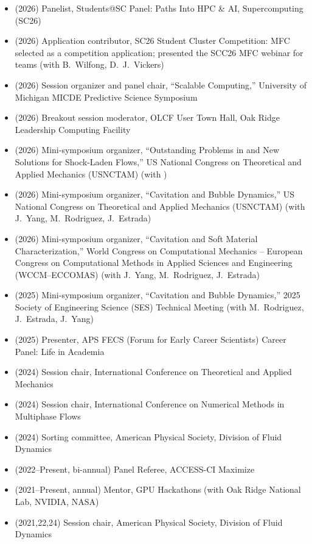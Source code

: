 \begin{itemize}
    \item (2026) Panelist, Students@SC Panel: Paths Into HPC \& AI, Supercomputing (SC26)
    \item (2026) Application contributor, SC26 Student Cluster Competition: MFC selected as a competition application; presented the SCC26 MFC webinar for teams (with B.~Wilfong, D.~J.~Vickers)
    \item (2026) Session organizer and panel chair, ``Scalable Computing,'' University of Michigan MICDE Predictive Science Symposium
    \item (2026) Breakout session moderator, OLCF User Town Hall, Oak Ridge Leadership Computing Facility
    \item (2026) Mini-symposium organizer, ``Outstanding Problems in and New Solutions for Shock-Laden Flows,'' US National Congress on Theoretical and Applied Mechanics (USNCTAM) (with \Florian)
    \item (2026) Mini-symposium organizer, ``Cavitation and Bubble Dynamics,'' US National Congress on Theoretical and Applied Mechanics (USNCTAM) (with J.~Yang, M.~Rodriguez, J.~Estrada)
    \item (2026) Mini-symposium organizer, ``Cavitation and Soft Material Characterization,'' World Congress on Computational Mechanics -- European Congress on Computational Methods in Applied Sciences and Engineering (WCCM--ECCOMAS) (with J.~Yang, M.~Rodriguez, J.~Estrada)
    \item (2025) Mini-symposium organizer, ``Cavitation and Bubble Dynamics,'' 2025 Society of Engineering Science (SES) Technical Meeting (with M.~Rodriguez, J.~Estrada, J.~Yang)
    \item (2025) Presenter, APS FECS (Forum for Early Career Scientists) Career Panel: Life in Academia
    \item (2024) Session chair, International Conference on Theoretical and Applied Mechanics
    \item (2024) Session chair, International Conference on Numerical Methods in Multiphase Flows
    \item (2024) Sorting committee, American Physical Society, Division of Fluid Dynamics
    \item (2022--Present, bi-annual) Panel Referee, ACCESS-CI Maximize
    \item (2021--Present, annual) Mentor, GPU Hackathons (with Oak Ridge National Lab, NVIDIA, NASA)
    \item (2021,22,24) Session chair, American Physical Society, Division of Fluid Dynamics

\end{itemize}
